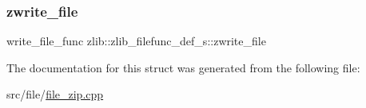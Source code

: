 \subsubsection{\texorpdfstring{zwrite\+\_\+file}{zwrite\_file}}
{\footnotesize\ttfamily write\+\_\+file\+\_\+func zlib\+::zlib\+\_\+filefunc\+\_\+def\+\_\+s\+::zwrite\+\_\+file}



The documentation for this struct was generated from the following file\+:\begin{DoxyCompactItemize}
\item 
src/file/\hyperlink{file__zip_8cpp}{file\+\_\+zip.\+cpp}\end{DoxyCompactItemize}
